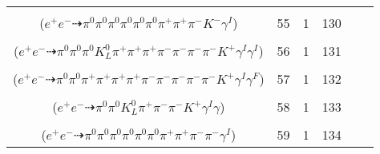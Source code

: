 \documentclass[landscape]{article}
\newcounter{rownumbers}
\newcommand\rn{\stepcounter{rownumbers}\arabic{rownumbers}}
\newcommand{\EOL}{\\} %
\newcommand{\topoTags}[1]{#1} %
\begin{document}
\begin{longtable}{clcccc}
\rn & \makecell[l]{ $ 
e^{+} e^{-} \rightarrow \pi^{0} \pi^{0} \pi^{+} \rho^{+} \rho^{-} K^{0} K^{-} \gamma^{I} ,
\rho^{+} \rightarrow \pi^{0} \pi^{+} ,
\rho^{-} \rightarrow \pi^{0} \pi^{-} ,
K^{0} \rightarrow K_{S}^{0} ,
K_{S}^{0} \rightarrow \pi^{0} \pi^{0} 
$ \\ ($
e^{+} e^{-} \dashrightarrow \pi^{0} \pi^{0} \pi^{0} \pi^{0} \pi^{0} \pi^{0} \pi^{+} \pi^{+} \pi^{-} K^{-} \gamma^{I} 
$) } & \topoTags{55 & }1 & 130 \EOL

\rn & \makecell[l]{ $ 
e^{+} e^{-} \rightarrow \pi^{0} \pi^{+} \pi^{-} \pi^{-} \eta \omega \bar{K}^{0} K^{+} \gamma^{I} \gamma^{I} ,
\eta \rightarrow \pi^{0} \pi^{+} \pi^{-} ,
\omega \rightarrow \pi^{0} \pi^{+} \pi^{-} ,
\bar{K}^{0} \rightarrow K_{L}^{0} 
$ \\ ($
e^{+} e^{-} \dashrightarrow \pi^{0} \pi^{0} \pi^{0} K_{L}^{0} \pi^{+} \pi^{+} \pi^{+} \pi^{-} \pi^{-} \pi^{-} \pi^{-} K^{+} \gamma^{I} \gamma^{I} 
$) } & \topoTags{56 & }1 & 131 \EOL

\rn & \makecell[l]{ $ 
e^{+} e^{-} \rightarrow \pi^{0} \rho^{0} \pi^{+} \pi^{-} \pi^{-} \rho^{+} \bar{K}^{0} K^{*} \gamma^{I} ,
\rho^{0} \rightarrow \pi^{+} \pi^{-} ,
\rho^{+} \rightarrow \pi^{0} \pi^{+} \gamma^{F} ,
\bar{K}^{0} \rightarrow K_{S}^{0} ,
K^{*} \rightarrow \pi^{-} K^{+} ,
K_{S}^{0} \rightarrow \pi^{+} \pi^{-} 
$ \\ ($
e^{+} e^{-} \dashrightarrow \pi^{0} \pi^{0} \pi^{+} \pi^{+} \pi^{+} \pi^{+} \pi^{-} \pi^{-} \pi^{-} \pi^{-} \pi^{-} K^{+} \gamma^{I} \gamma^{F} 
$) } & \topoTags{57 & }1 & 132 \EOL

\rn & \makecell[l]{ $ 
e^{+} e^{-} \rightarrow \omega \bar{K}^{0} K^{*} \phi \gamma^{I} ,
\omega \rightarrow \pi^{0} \gamma ,
\bar{K}^{0} \rightarrow K_{L}^{0} ,
K^{*} \rightarrow \pi^{-} K^{+} ,
\phi \rightarrow \pi^{-} \rho^{+} ,
\rho^{+} \rightarrow \pi^{0} \pi^{+} 
$ \\ ($
e^{+} e^{-} \dashrightarrow \pi^{0} \pi^{0} K_{L}^{0} \pi^{+} \pi^{-} \pi^{-} K^{+} \gamma^{I} \gamma 
$) } & \topoTags{58 & }1 & 133 \EOL

\rn & \makecell[l]{ $ 
e^{+} e^{-} \rightarrow \pi^{0} \pi^{0} \pi^{+} \pi^{-} \eta \omega \gamma^{I} ,
\eta \rightarrow \pi^{0} \pi^{0} \pi^{0} ,
\omega \rightarrow \pi^{0} \pi^{+} \pi^{-} 
$ \\ ($
e^{+} e^{-} \dashrightarrow \pi^{0} \pi^{0} \pi^{0} \pi^{0} \pi^{0} \pi^{0} \pi^{+} \pi^{+} \pi^{-} \pi^{-} \gamma^{I} 
$) } & \topoTags{59 & }1 & 134 \EOL


\end{longtable}
\end{document}
